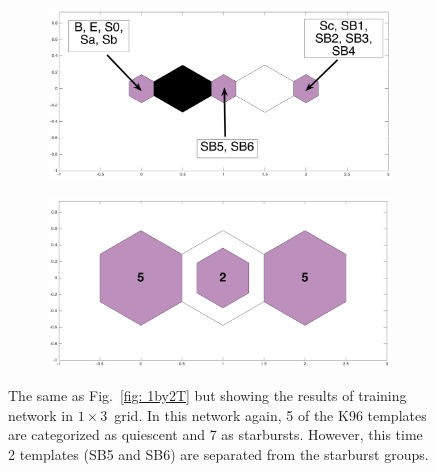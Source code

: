             \begin{figure}
                \begin{subfigure}[b]{0.5\textwidth}
                    \centering
                    \includegraphics[width=\textwidth]{images0.01/1d/dist_1_by_3.png}
                \end{subfigure}
                \hfill
                \begin{subfigure}[b]{0.5\textwidth}
                     \includegraphics[width=\textwidth]{images0.01/1d/hit_t_1_by_3.png}
                \end{subfigure}
                \caption{The same as Fig.~\ref{fig: 1by2T} but showing the results of training network in $1\times3$~grid. In this network again, 5 of the K96 templates are categorized as quiescent and 7 as starbursts. However, this time 2  templates (SB5 and SB6) are separated from the starburst groups.}
                 \label{fig: 1by3T}
            \end{figure}
           
